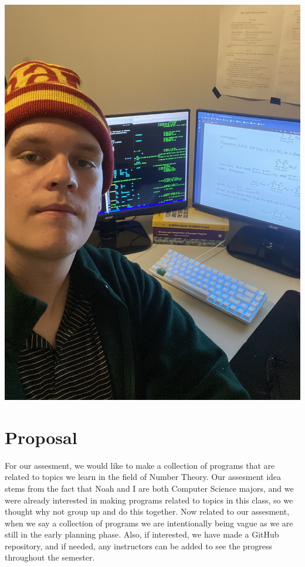 \documentclass[11pt]{article}
\begin{document}
\begin{center}
\includegraphics[scale=0.07]{noah}
\end{center}
\newpage
\section*{Proposal}
For our assesment, we would like to make a collection of programs that are related to topics we learn in the field of Number Theory.
Our assesment idea stems from the fact that Noah and I are both Computer Science majors, and we were already interested in making programs related to topics in this class, so we thought why not group up and do this together.
Now related to our assesment, when we say a collection of programs we are intentionally being vague as we are still in the early planning phase.
Also, if interested, we have made a GitHub repository, and if needed, any instructors can be added to see the progress throughout the semester.
\end{document}
